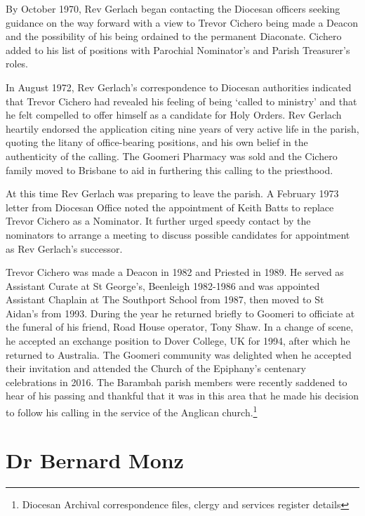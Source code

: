 By October 1970, Rev Gerlach began contacting the Diocesan officers seeking guidance on the way forward with a view to Trevor Cichero being made a Deacon and the possibility of his being ordained to the permanent Diaconate. Cichero added to his list of positions with Parochial Nominator's and Parish Treasurer's roles.



In August 1972, Rev Gerlach's correspondence to Diocesan authorities indicated that Trevor Cichero had revealed his feeling of being `called to ministry' and that he felt compelled to offer himself as a candidate for Holy Orders. Rev Gerlach heartily endorsed the application citing nine years of very active life in the parish, quoting the litany of office-bearing positions, and his own belief in the authenticity of the calling. The Goomeri Pharmacy was sold and the Cichero family moved to Brisbane to aid in furthering this calling to the priesthood.



At this time Rev Gerlach was preparing to leave the parish. A February 1973 letter from Diocesan Office noted the appointment of Keith Batts to replace Trevor Cichero as a Nominator. It further urged speedy contact by the nominators to arrange a meeting to discuss possible candidates for appointment as Rev Gerlach's successor.



\balance


Trevor Cichero was made a Deacon in 1982 and Priested in 1989. He served as Assistant Curate at St George's, Beenleigh 1982-1986 and was appointed Assistant Chaplain at The Southport School from 1987, then moved to St Aidan's from 1993. During the year he returned briefly to Goomeri to officiate at the funeral of his friend, Road House operator, Tony Shaw. In a change of scene, he accepted an exchange position to Dover College, UK for 1994, after which he returned to Australia. The Goomeri community was delighted when he accepted their invitation and attended the Church of the Epiphany's centenary celebrations in 2016. The Barambah parish members were recently saddened to hear of his passing and thankful that it was in this area that he made his decision to follow his calling in the service of the Anglican church.\footnote{Diocesan Archival correspondence files, clergy and services register details}


\section{Dr Bernard Monz}



